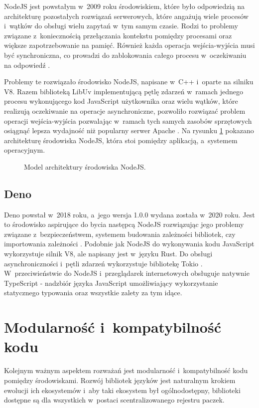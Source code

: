 NodeJS jest powstałym w~2009 roku środowiskiem, które było odpowiedzią na architekturę pozostałych rozwiązań serwerowych, które angażują wiele procesów i~wątków do obsługi wielu zapytań w~tym samym czasie. Rodzi to problemy związane z~koniecznością przełączania kontekstu pomiędzy procesami oraz większe zapotrzebowanie na pamięć. Również każda operacja wejścia-wyjścia musi być synchroniczna, co prowadzi do zablokowania całego procesu w~oczekiwaniu na odpowiedź \cite{nodejs}.

Problemy te rozwiązało środowisko NodeJS, napisane w~C++ i~oparte na silniku V8. Razem biblioteką LibUv \cite{libuv} implementującą pętlę zdarzeń w~ramach jednego procesu wykonującego kod JavaScript użytkownika oraz wielu wątków, które realizują oczekiwanie na operacje asynchroniczne, pozwoliło rozwiązać problem operacji wejścia-wyjścia pozwalając w~ramach tych samych zasobów sprzętowych osiągnąć lepsza wydajność niż popularny serwer Apache \cite{node-apache}. Na rysunku \ref{fig:nodejs} pokazano architekturę środowiska NodeJS, która stoi pomiędzy aplikacją, a~systemem operacyjnym.

\begin{figure}
    \centering
     
    \caption{Model architektury środowiska NodeJS.}
    \label{fig:nodejs}
\end{figure}

\subsection{Deno}

Deno powstał w~2018 roku, a~jego wersja 1.0.0 wydana została w~2020 roku. Jest to środowisko aspirujące do bycia następcą NodeJS rozwiązując jego problemy związane z~bezpieczeństwem, systemem budowania zależności bibliotek, czy importowania zależności \cite{deno}. Podobnie jak NodeJS do wykonywania kodu JavaScript wykorzystuje silnik V8, ale napisany jest w~języku Rust. Do obsługi asynchroniczności i~pętli zdarzeń wykorzystuje bibliotekę Tokio \cite{tokio}. W~przeciwieństwie do NodeJS i~przeglądarek internetowych obsługuje natywnie TypeScript - nadzbiór języka JavaScript umożliwiający wykorzystanie statycznego typowania oraz wszystkie zalety za tym idące.

\section{Modularność i~kompatybilność kodu}

Kolejnym ważnym aspektem rozważań jest modularność i~kompatybilność kodu pomiędzy środowiskami. Rozwój bibliotek języków jest naturalnym krokiem ewolucji ich ekosystemów i~aby taki ekosystem był ogólnodostępny, biblioteki dostępne są dla wszystkich w~postaci scentralizowanego rejestru paczek. 

